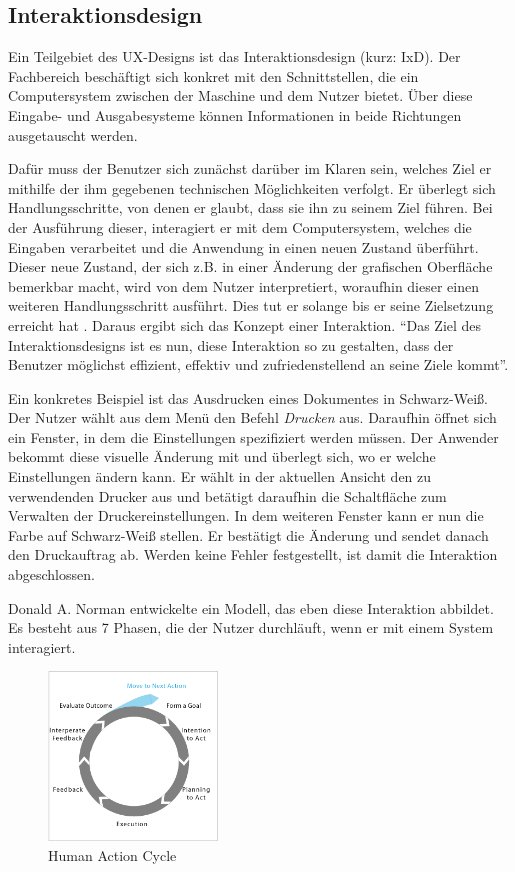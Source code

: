 \subsection{Interaktionsdesign} \label{sec:interactionDesign}
Ein Teilgebiet des UX-Designs ist das Interaktionsdesign (kurz: IxD). Der Fachbereich beschäftigt sich konkret mit den Schnittstellen, die ein Computersystem zwischen der Maschine und dem Nutzer bietet. Über diese Eingabe- und Ausgabesysteme können Informationen in beide Richtungen ausgetauscht werden.\par
Dafür muss der Benutzer sich zunächst darüber im Klaren sein, welches Ziel er mithilfe der ihm gegebenen technischen Möglichkeiten verfolgt. Er überlegt sich Handlungsschritte, von denen er glaubt, dass sie ihn zu seinem Ziel führen. Bei der Ausführung dieser, interagiert er mit dem Computersystem, welches die Eingaben verarbeitet und die Anwendung in einen neuen Zustand überführt. Dieser neue Zustand, der sich z.B. in einer Änderung der grafischen Oberfläche bemerkbar macht, wird von dem Nutzer interpretiert, woraufhin dieser einen weiteren Handlungsschritt ausführt. Dies tut er solange bis er seine Zielsetzung erreicht hat \cite{Ullenboom2014}. Daraus ergibt sich das Konzept einer Interaktion. \enquote{Das Ziel des Interaktionsdesigns ist es nun, diese Interaktion so zu gestalten, dass der Benutzer möglichst effizient, effektiv und zufriedenstellend an seine Ziele kommt\cite[S. 122]{Ullenboom2014}}.\par
Ein konkretes Beispiel ist das Ausdrucken eines Dokumentes in Schwarz-Weiß. Der Nutzer wählt aus dem Menü den Befehl \textit{Drucken} aus. Daraufhin öffnet sich ein Fenster, in dem die Einstellungen spezifiziert werden müssen. Der Anwender bekommt diese visuelle Änderung mit und überlegt sich, wo er welche Einstellungen ändern kann. Er wählt in der aktuellen Ansicht den zu verwendenden Drucker aus und betätigt daraufhin die Schaltfläche zum Verwalten der Druckereinstellungen. In dem weiteren Fenster kann er nun die Farbe auf Schwarz-Weiß stellen. Er bestätigt die Änderung und sendet danach den Druckauftrag ab. Werden keine Fehler festgestellt, ist damit die Interaktion abgeschlossen.\par
Donald A. Norman entwickelte ein Modell, das eben diese Interaktion abbildet. Es besteht aus 7 Phasen, die der Nutzer durchläuft, wenn er mit einem System interagiert. \par
\begin{figure}[H]
 \centering
 \includegraphics[width=0.4\textwidth]{grafiken/action_cycle.png}
 \caption{Human Action Cycle \cite{Kinser2011}}
 \label{fig:actionCycle}
\end{figure}
